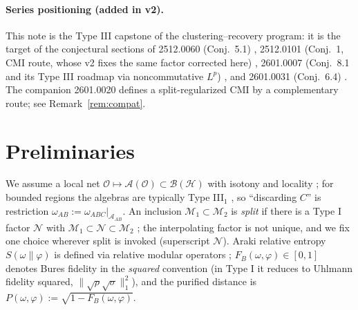 \documentclass[11pt]{article}
\theoremstyle{remark}
\begin{document}
\paragraph{Series positioning (added in v2).} This note is the Type III
capstone of the clustering--recovery program: it is the target of the
conjectural sections of 2512.0060 (Conj.~5.1) \cite{S0060}, 2512.0101
(Conj.~1, CMI route, whose v2 fixes the same factor corrected here)
\cite{S0101}, 2601.0007 (Conj.~8.1 and its Type III roadmap via
noncommutative $L^p$) \cite{S0007}, and 2601.0031 (Conj.~6.4)
\cite{S0031}. The companion 2601.0020 \cite{S0020} defines a
split-regularized CMI by a complementary route; see
Remark~\ref{rem:compat}.

\section{Preliminaries}
We assume a local net $\mathcal{O} \mapsto \mathcal{A}(\mathcal{O})
\subset \mathcal{B}(\mathcal{H})$ with isotony and locality \cite{Haag,
BR}; for bounded regions the algebras are typically Type III$_1$
\cite{Yngvason}, so ``discarding $C$'' is restriction $\omega_{AB} :=
\omega_{ABC}|_{\mathcal{A}_{AB}}$. An inclusion $\mathcal{M}_1 \subset
\mathcal{M}_2$ is \emph{split} if there is a Type I factor $\mathcal{N}$
with $\mathcal{M}_1 \subset \mathcal{N} \subset \mathcal{M}_2$
\cite{DL, BW}; the interpolating factor is not unique, and we fix one
choice wherever split is invoked (superscript $\mathcal{N}$). Araki
relative entropy $S(\omega\|\varphi)$ is defined via relative modular
operators \cite{Araki1, Araki2}; $F_B(\omega, \varphi) \in [0,1]$ denotes
Bures fidelity in the \emph{squared} convention (in Type I it reduces to
Uhlmann fidelity squared, $\|\sqrt\rho\sqrt\sigma\|_1^2$), and the
purified distance is $P(\omega,\varphi) := \sqrt{1 - F_B(\omega,
\varphi)}$.
\end{document}
